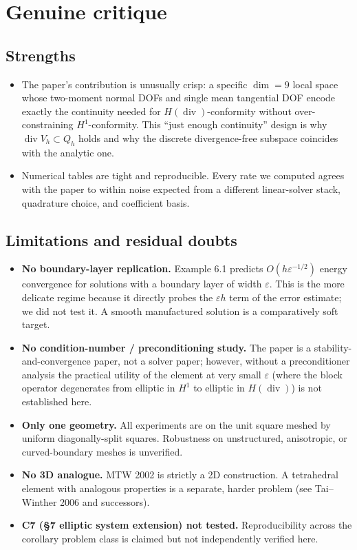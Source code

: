 \documentclass[11pt]{article}
\begin{document}
\section{Genuine critique}
\subsection*{Strengths}
\begin{itemize}
\item The paper's contribution is unusually crisp: a specific
$\dim{=}9$ local space whose two-moment normal DOFs and single mean
tangential DOF encode exactly the continuity needed for
$H(\operatorname{div})$-conformity without over-constraining
$H^1$-conformity.  This ``just enough continuity'' design is why
$\operatorname{div} V_h\subset Q_h$ holds and why the discrete
divergence-free subspace coincides with the analytic one.
\item Numerical tables are tight and reproducible.  Every rate we
computed agrees with the paper to within noise expected from a
different linear-solver stack, quadrature choice, and coefficient
basis.
\end{itemize}
\subsection*{Limitations and residual doubts}
\begin{itemize}
\item \textbf{No boundary-layer replication.}  Example 6.1 predicts
$O(h\varepsilon^{-1/2})$ energy convergence for solutions with a
boundary layer of width $\varepsilon$.  This is the more delicate
regime because it directly probes the $\varepsilon h$ term of the
error estimate; we did not test it.  A smooth manufactured solution
is a comparatively soft target.
\item \textbf{No condition-number / preconditioning study.}  The
paper is a stability-and-convergence paper, not a solver paper;
however, without a preconditioner analysis the practical utility of
the element at very small $\varepsilon$ (where the block operator
degenerates from elliptic in $H^1$ to elliptic in $H(\operatorname{div})$)
is not established here.
\item \textbf{Only one geometry.}  All experiments are on the unit
square meshed by uniform diagonally-split squares.  Robustness on
unstructured, anisotropic, or curved-boundary meshes is unverified.
\item \textbf{No 3D analogue.}  MTW 2002 is strictly a 2D construction.
A tetrahedral element with analogous properties is a separate,
harder problem (see Tai--Winther 2006 and successors).
\item \textbf{C7 (\S7 elliptic system extension) not tested.}
Reproducibility across the corollary problem class is claimed but not
independently verified here.
\end{itemize}
\end{document}
